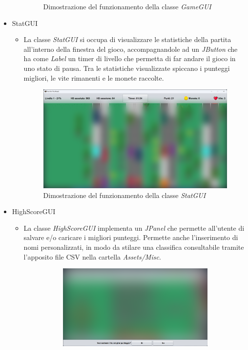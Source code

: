 \documentclass[12pt,a4paper]{report}
\begin{document}
\begin{itemize}
\begin{itemize}
\begin{figure}[H]
			\caption{Dimostrazione del funzionamento della classe \emph{GameGUI}}
			\label{fig:GameGUI}
		\end{figure}
	\end{itemize}
	\item StatGUI
	\begin{itemize}
		\item La classe \emph{StatGUI} si occupa di visualizzare le statistiche della partita all'interno della finestra del gioco, accompagnandole ad un \emph{JButton} che ha come \emph{Label} un timer di livello che permetta di far andare il gioco in uno stato di pausa. Tra le statistiche visualizzate spiccano i punteggi migliori, le vite rimanenti e le monete raccolte.
		\begin{figure}[H]
			\centering
			\includegraphics[width=1\textwidth, trim=2 2 2 2, clip]{StatGUI.png}
			\caption{Dimostrazione del funzionamento della classe \emph{StatGUI}}
			\label{fig:StatGUI}
		\end{figure}
	\end{itemize}
	\item HighScoreGUI
	\begin{itemize}
		\item La classe \emph{HighScoreGUI} implementa un \emph{JPanel} che permette all'utente di salvare e/o caricare i migliori punteggi. Permette anche l'inserimento di nomi personalizzati, in modo da stilare una classifica consultabile tramite l'apposito file CSV nella cartella \emph{Assets/Misc}.
		\begin{figure}[H]
			\begin{subfigure}{0.5\textwidth}
				\centering
				\includegraphics[width=1\textwidth, trim=2 2 2 2, clip]{HSGUI_Load.png}

\end{subfigure}
\end{figure}
\end{itemize}
\end{itemize}
\end{document}
